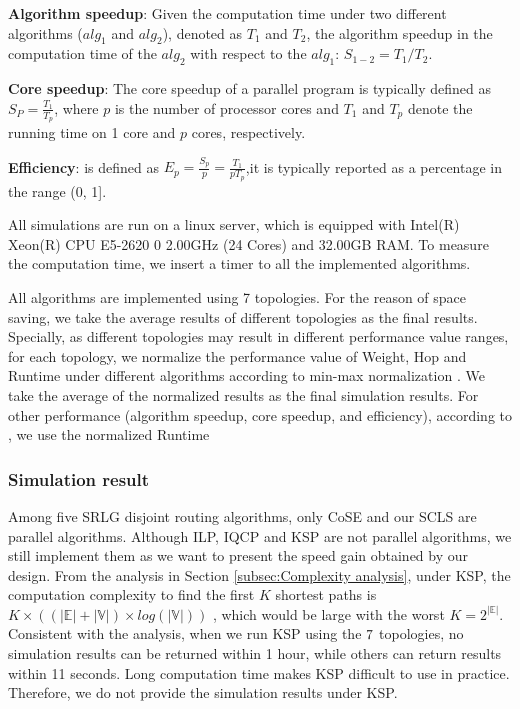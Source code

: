 \textbf{Algorithm speedup}: Given the computation time under two different  algorithms ($alg_1$ and $alg_2$), denoted as $T_1$ and $T_2$, the algorithm speedup in the computation time of the $alg_2$ with respect to the $alg_1$: ${S_{1 - 2}} = T_1/T_2$.

\textbf{Core speedup}: The core speedup \cite{grama2003introduction} of a parallel program is typically defined as $S_P=\frac{T_1}{T_p}$,
where $p$ is the number of processor cores and $T_1$ and $T_p$ denote the running time on 1 core and $p$ cores, respectively.

\textbf{Efficiency}: is defined \cite{grama2003introduction} as $E_p=\frac{S_p}{p}=\frac{T_1}{pT_p}$,it is typically reported as a percentage in the range (0, 1].

All simulations are run on a linux server, which is equipped with Intel(R) Xeon(R) CPU E5-2620 0 \@ 2.00GHz (24 Cores) and 32.00GB RAM. To measure the computation time, we insert a timer to all the implemented algorithms.

All algorithms are implemented using 7 topologies. For the reason of space saving, we take the average results of different topologies as the final results. Specially, as different topologies may result in different performance value ranges, for each topology, we normalize the performance value of Weight, Hop and Runtime under different algorithms according to min-max normalization \cite{tax2000feature}. We take the average of the normalized results as the final simulation results. For other performance  (algorithm speedup, core speedup, and efficiency), according to , we use the normalized Runtime 
\subsubsection{Simulation result}
\label{subsubsec:Simulation result}
Among  five SRLG disjoint routing algorithms, only CoSE and our SCLS are parallel algorithms. Although ILP, IQCP and KSP are not parallel algorithms, we still implement them as we want to present the speed gain obtained by our design.
From the analysis in Section \ref{subsec:Complexity analysis}, under KSP, the computation complexity to find the first $K$ shortest paths is $K\times ((|\mathbb{E}|+|\mathbb{V}|)\times log(|\mathbb{V}|))$ , which would be large with the worst $K=2^{|\mathbb{E}|}$.
 Consistent with the analysis, when we run KSP using the $7$ topologies, no simulation results can be returned within 1 hour, while others can return results within 11 seconds. Long computation time makes KSP difficult to use in practice. Therefore, we do not provide the simulation results under KSP.

